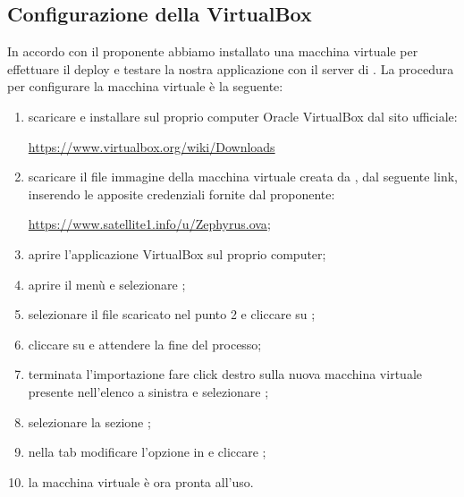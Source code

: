 	\subsection{Configurazione della VirtualBox}
	In accordo con il proponente abbiamo installato una macchina virtuale per effettuare il deploy e testare la nostra applicazione con il server di \riskapp{}. La procedura per configurare la macchina virtuale è la seguente:
	\begin{enumerate}
		\item scaricare e installare sul proprio computer Oracle VirtualBox dal sito ufficiale:
		\begin{center}
			\url{https://www.virtualbox.org/wiki/Downloads}
		\end{center} 
		\item scaricare il file immagine della macchina virtuale creata da \riskapp{},  dal seguente link, inserendo le apposite credenziali fornite dal proponente:
		\begin{center}
			\url{https://www.satellite1.info/u/Zephyrus.ova};
		\end{center} 
		\item aprire l'applicazione VirtualBox sul proprio computer;
		\item aprire il menù  e selezionare ;
		\item selezionare il file  scaricato nel punto 2 e cliccare su ;
		\item cliccare su  e attendere la fine del processo;
		\item terminata l'importazione fare click destro sulla nuova macchina virtuale presente nell'elenco a sinistra e selezionare ;
		\item selezionare la sezione ;
		\item nella tab  modificare l'opzione  in  e cliccare ;
		\item la macchina virtuale è ora pronta all'uso.
	\end{enumerate}
